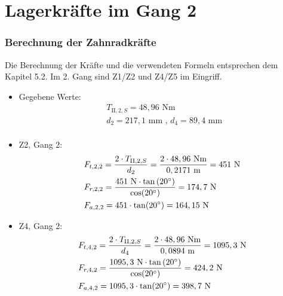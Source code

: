 \section{Lagerkräfte im Gang 2}
\subsubsection{Berechnung der Zahnradkräfte}
Die Berechnung der Kräfte und die verwendeten Formeln entsprechen dem Kapitel 5.2. Im 2. Gang sind Z1/Z2 und Z4/Z5 im Eingriff.
\begin{itemize}
\item Gegebene Werte: 
	\begin{align*}
	&T_{\mathrm{II},2,S} = 48,96\text{ Nm} \\
	&d_2 = 217,1\text{ mm} \text{ , } d_4 = 89,4 \text{ mm } \\
	\end{align*}
\item Z2, Gang 2:
	\begin{align*} 
	&F_{t,2,2} = \frac{2\cdot T_{\mathrm{II},2,S}}{d_2} = \frac{2 \cdot 48,96 \text{ Nm}}{0,2171 \text{ m}} = 451 \text{ N}\\ 
	&F_{r,2,2} = \frac{451 \text{ N} \cdot \tan{(20^\circ)}}{\cos(20^\circ)} = 174,7\text{ N}\\ 
	&F_{a,2,2} =451 \cdot \tan(20^\circ) =164,15 \text{ N}
	\end{align*}
\item Z4, Gang 2:
	\begin{align*} 
	&F_{t,4,2} = \frac{2\cdot T_{\mathrm{II},2,S}}{d_4} = \frac{2 \cdot 48,96 \text{ Nm}}{0,0894 \text{ m}} = 1095,3 \text{ N}\\ 
	&F_{r,4,2} = \frac{1095,3 \text{ N} \cdot \tan{(20^\circ)}}{\cos(20^\circ)} = 424,2\text{ N}\\ 
	&F_{a,4,2} =1095,3 \cdot \tan(20^\circ) =398,7 \text{ N}
	\end{align*}
\end{itemize}
